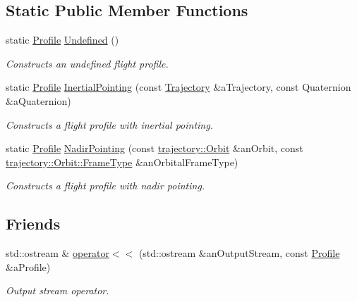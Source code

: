 \subsection*{Static Public Member Functions}
\begin{DoxyCompactItemize}
\item 
static \hyperlink{classlibrary_1_1astro_1_1flight_1_1_profile}{Profile} \hyperlink{classlibrary_1_1astro_1_1flight_1_1_profile_a1d3924edd09ed4d5ffe0a22bfa75fb38}{Undefined} ()
\begin{DoxyCompactList}\small\item\em Constructs an undefined flight profile. \end{DoxyCompactList}\item 
static \hyperlink{classlibrary_1_1astro_1_1flight_1_1_profile}{Profile} \hyperlink{classlibrary_1_1astro_1_1flight_1_1_profile_a03292340098b9dffc758ae0e000d1f2b}{Inertial\+Pointing} (const \hyperlink{classlibrary_1_1astro_1_1_trajectory}{Trajectory} \&a\+Trajectory, const Quaternion \&a\+Quaternion)
\begin{DoxyCompactList}\small\item\em Constructs a flight profile with inertial pointing. \end{DoxyCompactList}\item 
static \hyperlink{classlibrary_1_1astro_1_1flight_1_1_profile}{Profile} \hyperlink{classlibrary_1_1astro_1_1flight_1_1_profile_ac4096e4ced738e675f2f14722bbfbe14}{Nadir\+Pointing} (const \hyperlink{classlibrary_1_1astro_1_1trajectory_1_1_orbit}{trajectory\+::\+Orbit} \&an\+Orbit, const \hyperlink{classlibrary_1_1astro_1_1trajectory_1_1_orbit_a816e83a0c220d4242ce2bebd32191cd8}{trajectory\+::\+Orbit\+::\+Frame\+Type} \&an\+Orbital\+Frame\+Type)
\begin{DoxyCompactList}\small\item\em Constructs a flight profile with nadir pointing. \end{DoxyCompactList}\end{DoxyCompactItemize}
\subsection*{Friends}
\begin{DoxyCompactItemize}
\item 
std\+::ostream \& \hyperlink{classlibrary_1_1astro_1_1flight_1_1_profile_a8747e69fc10f1b068a0dd02d79da3b95}{operator$<$$<$} (std\+::ostream \&an\+Output\+Stream, const \hyperlink{classlibrary_1_1astro_1_1flight_1_1_profile}{Profile} \&a\+Profile)
\begin{DoxyCompactList}\small\item\em Output stream operator. \end{DoxyCompactList}\end{DoxyCompactItemize}


